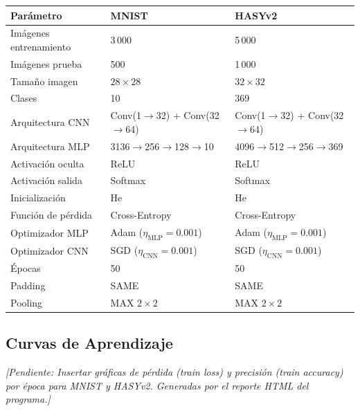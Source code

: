 \documentclass[12pt,a4paper]{article}
\newcommand{\todo}[1]{\textit{\textcolor{codegray}{[Pendiente: #1]}}}
\begin{document}
\begin{center}
\begin{tabular}{lll}
\toprule
\textbf{Parámetro}        & \textbf{MNIST}                         & \textbf{HASYv2} \\
\midrule
Imágenes entrenamiento     & 3\,000                                 & 5\,000 \\
Imágenes prueba            & 500                                    & 1\,000 \\
Tamaño imagen              & $28 \times 28$                         & $32 \times 32$ \\
Clases                     & 10                                     & 369 \\
Arquitectura CNN           & Conv(1$\to$32) + Conv(32$\to$64)       & Conv(1$\to$32) + Conv(32$\to$64) \\
Arquitectura MLP           & 3136$\to$256$\to$128$\to$10            & 4096$\to$512$\to$256$\to$369 \\
Activación oculta          & ReLU                                   & ReLU \\
Activación salida          & Softmax                                & Softmax \\
Inicialización             & He                                     & He \\
Función de pérdida         & Cross-Entropy                          & Cross-Entropy \\
Optimizador MLP            & Adam ($\eta_{\text{MLP}}=0.001$)       & Adam ($\eta_{\text{MLP}}=0.001$) \\
Optimizador CNN            & SGD  ($\eta_{\text{CNN}}=0.001$)       & SGD  ($\eta_{\text{CNN}}=0.001$) \\
Épocas                     & 50                                     & 50 \\
Padding                    & SAME                                   & SAME \\
Pooling                    & MAX $2\times2$                         & MAX $2\times2$ \\
\bottomrule
\end{tabular}
\end{center}

\subsection{Curvas de Aprendizaje}

\todo{Insertar gráficas de pérdida (train loss) y precisión (train accuracy) por época
para MNIST y HASYv2. Generadas por el reporte HTML del programa.}
\end{document}
